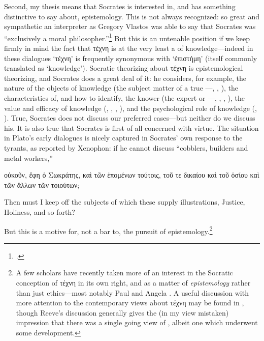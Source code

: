 \documentclass[11pt,letterpaper,oneside]{amsart} %
\begin{document}
Second, my thesis means that Socrates is interested in, and has something distinctive to say about, epistemology. This is not always recognized: so great and sympathetic an interpreter as Gregory Vlastos was able to say that Socrates was ``exclusively a moral philosopher.''\footnote{\citet[p.\ 41]{vlastos1991socrates}.} But this is an untenable position if we keep firmly in mind the fact that τέχνη is at the very least a  of knowledge---indeed in these dialogues `τέχνη' is frequently synonymous with `ἐπιστήμη' (itself commonly translated as `knowledge'). Socratic theorizing about τέχνη is  epistemological theorizing, and Socrates does a great deal of it: he considers, for example, the nature of the objects of knowledge (\ie the subject matter of a true \techne---, , ), the characteristics of, and how to identify, the knower (\ie the expert or \technites---, , , ), the value and efficacy of knowledge (, , , ), and the psychological role of knowledge (, ). True, Socrates does not discuss our preferred cases---but neither do we discuss his. It is also true that Socrates is first of all concerned with virtue. The situation in Plato's early dialogues is nicely captured in Socrates' own response to the tyrants, as reported by Xenophon: if he cannot discuss ``cobblers, builders and metal workers,''\begin{squote}οὐκοῦν, ἔφη ὁ Σωκράτης, καὶ τῶν ἑπομένων τούτοις, τοῦ τε δικαίου καὶ τοῦ ὁσίου καὶ τῶν ἄλλων τῶν τοιούτων;

\vspace{0.05in}

\noindent Then must I keep off the subjects of which these supply illustrations, Justice, Holiness, and so forth?\end{squote}But this is a motive for, not a bar to, the pursuit of epistemology.\footnote{A few scholars have recently taken more of an interest in the Socratic conception of τέχνη in its own right, and as a matter of \emph{epistemology} rather than just ethics---most notably Paul \citet{woodruff1990pse} and Angela \citet{asmith1998}. A useful discussion with more attention to the contemporary views about τέχνη may be found in \citet[37--45]{reeve1989sita}, though Reeve's discussion generally gives the (in my view mistaken) impression that there was a single going view of \techne, albeit one which underwent some development.}
\end{document}
